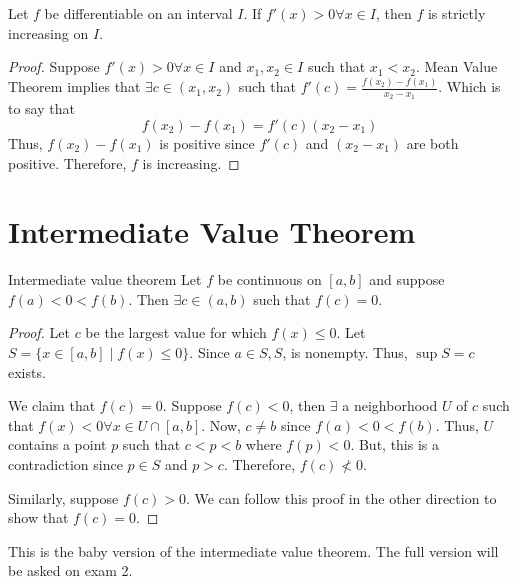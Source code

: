 \begin{theorem}{}{}
    Let $f$ be differentiable on an interval $I$. If $f'(x) > 0 \forall x \in I$, then $f$ is strictly increasing on $I$.
\end{theorem}
\begin{proof}
    Suppose $f'(x) > 0 \forall x \in I$ and $x_1, x_2 \in I$ such that $x_1 < x_2$. Mean Value Theorem implies that $\exists c \in (x_1, x_2)$ such that $f'(c) = \frac{f(x_2) - f(x_1)}{x_2 - x_1}$. Which is to say that $$f(x_2) - f(x_1) = f'(c) (x_2 - x_1)$$ Thus, $f(x_2) - f(x_1)$ is positive since $f'(c)$ and $(x_2 - x_1)$ are both positive. Therefore, $f$ is increasing.
\end{proof}

\section{Intermediate Value Theorem}
\begin{theorem}{Intermediate value theorem}{}
    Let $f$ be continuous on $[a,b]$ and suppose $f(a) < 0 < f(b)$. Then $\exists c \in (a,b)$ such that $f(c) = 0$.
\end{theorem}
\begin{proof}
    Let $c$ be the largest value for which $f(x) \leq 0$. Let $S = \{x \in [a, b] \mid f(x) \leq 0\}$. Since $a \in S, S$, is nonempty. Thus, $\sup S = c$ exists.

    We claim that $f(c) = 0$. Suppose $f(c) < 0$, then $\exists$ a neighborhood $U$ of $c$ such that $f(x) < 0 \forall x \in U \cap [a, b]$. Now, $c \neq b$ since $f(a) < 0 < f(b)$. Thus, $U$ contains a point $p$ such that $c < p < b$ where $f(p) < 0$. But, this is a contradiction since $p \in S$ and $p > c$. Therefore, $f(c) \not< 0$.

    Similarly, suppose $f(c) > 0$. We can follow this proof in the other direction to show that $f(c) = 0$.
\end{proof}
\begin{note}
    This is the baby version of the intermediate value theorem. The full version will be asked on exam 2.
\end{note}